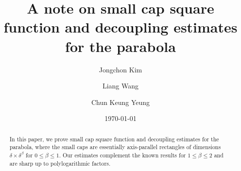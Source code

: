\documentclass[reqno,centertags,11pt,a4paper]{amsart}
\begin{document}
\newcommand{\leqC}{\lesssim}
\newcommand{\geqC}{\gtrsim}
\newcommand{\abs}[1]{\left|{#1}\right|}
\newcommand{\norm}[1]{\left\|{#1}\right\|}
\newcommand{\sbk}[1]{\left({#1}\right)}
\newcommand{\mbk}[1]{\left[{#1}\right]}
\newcommand{\bbk}[1]{\left\{{#1}\right\}}
\newcommand{\LpNorm}[2]{\left\|{#1}\right\|_{L^{#2}}}
\newcommand{\LpNormOn}[3]{\left\|{#1}\right\|_{L^{#2}(#3)}}

\newcommand{\bR}[1]{\mathbb{R}^{#1}}
\newcommand{\fhalf}{\frac{1}{2}}


\newcommand{\GamAlR}{ \mathcal{P}(\delta) }
\newcommand{\GamHfR}{ \mathcal{P}(\delta^{\frac{\beta}{2}}) }


\newcommand{\MainThmLHSOn}[1]{ \LpNormOn{ \sum_{ \gamma \in \GamAlR } f_\gamma }{p}{#1} }
\newcommand{\MainThmLHS}{ \MainThmLHSOn{\bR{2}} }
\newcommand{\MainThmRHSOn}[1]{ \LpNormOn{ \bigg( \sum_{ \gamma \in \GamAlR } \abs{f_\gamma}^2 \bigg)^\fhalf }{p}{#1} }
\newcommand{\MainThmRHS}{ \MainThmRHSOn{\bR{2}} }
\newcommand{\MainThmConsFir}{ \delta^{-\sbk{1-\frac{\beta}{2}}\sbk{\fhalf-\frac{1}{p}}} }
\newcommand{\MainThmConsSec}{  \delta^{-\sbk{\frac{1}{2} - \frac{1+\beta}{p}  }  }}

\newcommand{\SharpRect}{ {B_{\delta^{-1}\times\delta^{-\beta}}} }
\newcommand{\SharpRectG}{ {B_{ \abs{\tau}\delta^{-1} \times \abs{\tau}^2\delta^{-\beta}}} }
\newcommand{\SharpRectGR}{   {  B_{\abs{\tau}^2\delta^{-\beta}}  }    }

\title[Small cap square function and decoupling estimates]{A note on small cap square function and decoupling estimates for the parabola}
\author{Jongchon Kim}
\address{Department of Mathematics\\ City University of Hong Kong\\Hong Kong SAR}

\author{Liang Wang}
\address{Department of Mathematics\\ City University of Hong Kong\\Hong Kong SAR}

\author{Chun Keung Yeung}
\address{Department of Mathematics\\ City University of Hong Kong\\Hong Kong SAR}


\date{\today}
\begin{abstract}
In this paper, we prove small cap square function and decoupling estimates for the parabola, where the small caps are essentially axis-parallel rectangles of dimensions $\delta\times \delta^\beta$ for $0\leq \beta\leq 1$.
Our estimates complement the known results for $1 \leq \beta \leq 2$ and are sharp up to polylogarithmic factors.
\end{abstract}
\maketitle
\end{document}
